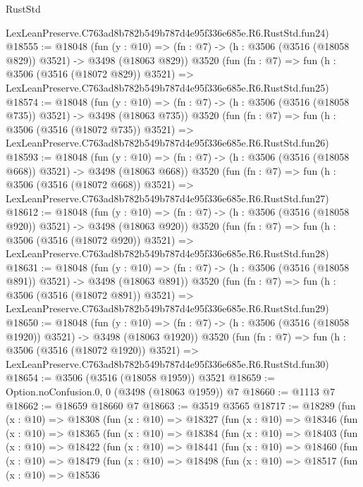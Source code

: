 \begin{lexlean}{RustStd}
\begin{coremodule}
    LexLeanPreserve.C763ad8b782b549b787d4e95f336e685e.R6.RustStd.fun24)
@18555 := @18048
    (fun (y : @10) => (fn : @7) -> (h : @3506 (@3516 (@18058 @829)) @3521) -> @3498 (@18063 @829))
    @3520
    (fun (fn : @7) =>
    fun (h : @3506 (@3516 (@18072 @829)) @3521) =>
    LexLeanPreserve.C763ad8b782b549b787d4e95f336e685e.R6.RustStd.fun25)
@18574 := @18048
    (fun (y : @10) => (fn : @7) -> (h : @3506 (@3516 (@18058 @735)) @3521) -> @3498 (@18063 @735))
    @3520
    (fun (fn : @7) =>
    fun (h : @3506 (@3516 (@18072 @735)) @3521) =>
    LexLeanPreserve.C763ad8b782b549b787d4e95f336e685e.R6.RustStd.fun26)
@18593 := @18048
    (fun (y : @10) => (fn : @7) -> (h : @3506 (@3516 (@18058 @668)) @3521) -> @3498 (@18063 @668))
    @3520
    (fun (fn : @7) =>
    fun (h : @3506 (@3516 (@18072 @668)) @3521) =>
    LexLeanPreserve.C763ad8b782b549b787d4e95f336e685e.R6.RustStd.fun27)
@18612 := @18048
    (fun (y : @10) => (fn : @7) -> (h : @3506 (@3516 (@18058 @920)) @3521) -> @3498 (@18063 @920))
    @3520
    (fun (fn : @7) =>
    fun (h : @3506 (@3516 (@18072 @920)) @3521) =>
    LexLeanPreserve.C763ad8b782b549b787d4e95f336e685e.R6.RustStd.fun28)
@18631 := @18048
    (fun (y : @10) => (fn : @7) -> (h : @3506 (@3516 (@18058 @891)) @3521) -> @3498 (@18063 @891))
    @3520
    (fun (fn : @7) =>
    fun (h : @3506 (@3516 (@18072 @891)) @3521) =>
    LexLeanPreserve.C763ad8b782b549b787d4e95f336e685e.R6.RustStd.fun29)
@18650 := @18048
    (fun (y : @10) => (fn : @7) -> (h : @3506 (@3516 (@18058 @1920)) @3521) -> @3498 (@18063 @1920))
    @3520
    (fun (fn : @7) =>
    fun (h : @3506 (@3516 (@18072 @1920)) @3521) =>
    LexLeanPreserve.C763ad8b782b549b787d4e95f336e685e.R6.RustStd.fun30)
@18654 := @3506 (@3516 (@18058 @1959)) @3521
@18659 := Option.noConfusion.{0, 0} (@3498 (@18063 @1959)) @7
@18660 := @1113 @7
@18662 := @18659 @18660 @7
@18663 := @3519 @3565
@18717 := @18289
    (fun (x : @10) =>
    @18308
      (fun (x : @10) =>
      @18327
        (fun (x : @10) =>
        @18346
          (fun (x : @10) =>
          @18365
            (fun (x : @10) =>
            @18384
              (fun (x : @10) =>
              @18403
                (fun (x : @10) =>
                @18422
                  (fun (x : @10) =>
                  @18441
                    (fun (x : @10) =>
                    @18460
                      (fun (x : @10) =>
                      @18479
                        (fun (x : @10) =>
                        @18498
                          (fun (x : @10) =>
                          @18517
                            (fun (x : @10) =>
                            @18536

\end{coremodule}
\end{lexlean}
